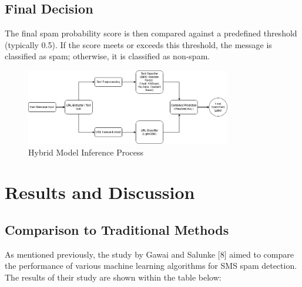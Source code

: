 \documentclass{article}
\begin{document}
\subsection{Final Decision}

The final spam probability score is then compared against a predefined threshold (typically 0.5). If the score meets or exceeds this threshold, the message is classified as spam; otherwise, it is classified as non-spam.

\begin{figure}[htbp]
    \centering
    \includegraphics[width=0.8\textwidth]{../analysis/Model_Pipeline_Flowchart.png}
    \caption{Hybrid Model Inference Process}
    \label{fig:inference_process}
\end{figure}

\section{Results and Discussion}
\subsection{Comparison to Traditional Methods}

\noindent
As mentioned previously, the study by Gawai and Salunke [8] aimed to compare the performance of various machine learning algorithms for SMS spam detection. The results of their study are shown within the table below:
\end{document}
